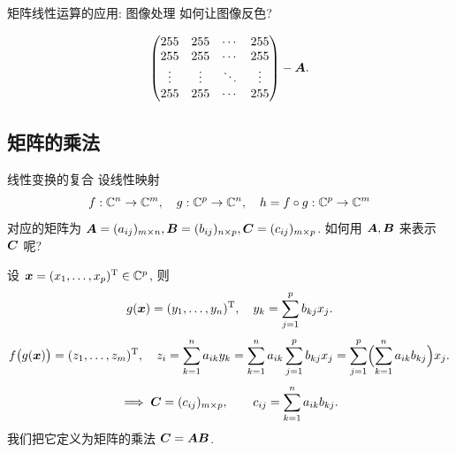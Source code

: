 \begin{frame}{矩阵线性运算的应用: 图像处理\noexer}
	\onslide<+->
	如何让图像反色?
	\begin{center}
	\end{center}

	\onslide<+->
	\[\begin{pmatrix}
		255&255&\cdots&255\\
		255&255&\cdots&255\\
		\vdots&\vdots&\ddots&\vdots\\
		255&255&\cdots&255
	\end{pmatrix}-{\boldsymbol{A}}.\]
\end{frame}

\subsection{矩阵的乘法}


\begin{frame}{线性变换的复合}
	\onslide<+->
	设线性映射
	\[f:{\mathbb{C}}^n\to{\mathbb{C}}^m,\quad
	g:{\mathbb{C}}^p\to {\mathbb{C}}^n,\quad 
	h=f\circ g:{\mathbb{C}}^p\to{\mathbb{C}}^m\]
	对应的矩阵为 ${\boldsymbol{A}}=(a_{ij})_{m\times n}, {\boldsymbol{B}}=(b_{ij})_{n\times p},{\boldsymbol{C}}=(c_{ij})_{m\times p}$.
	\onslide<+->
	如何用 ${\boldsymbol{A}},{\boldsymbol{B}}$ 来表示 ${\boldsymbol{C}}$ 呢?

	\onslide<+->
	设 ${\boldsymbol{x}}=(x_1,\dots,x_p)^{\mathrm{T}}\in {\mathbb{C}}^p$, 则
	\[g({\boldsymbol{x}})=(y_1,\dots,y_n)^{\mathrm{T}}, \quad
		y_k=\sum_{j=1}^p b_{kj} x_j.\]
	\onslide<+->
	\[f\bigl(g({\boldsymbol{x}})\bigr)=(z_1,\dots,z_m)^{\mathrm{T}}, \quad
	z_i=\sum_{k=1}^n a_{ik} y_k=\sum_{k=1}^n a_{ik} \sum_{j=1}^p b_{kj} x_j=\sum_{j=1}^p\Bigl(\sum_{k=1}^n a_{ik}b_{kj}\Bigr)x_j.\]
	\onslide<+->
	\[\implies{\boldsymbol{C}}=(c_{ij})_{m\times p},\qquad c_{ij}=\sum_{k=1}^n a_{ik}b_{kj}.\]
	\onslide<+->
	我们把它定义为矩阵的乘法 ${\boldsymbol{C}}={\boldsymbol{A}}{\boldsymbol{B}}$.
\end{frame}



